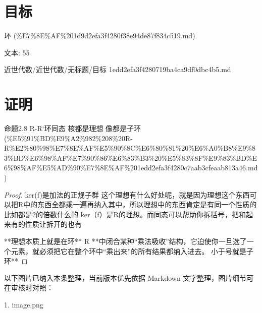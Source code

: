 \section*{目标}

\begin{note}[来源上级主题]

环 (\%E7\%8E\%AF\%201d9d2efa3f4280f38e94de87f834c519.md)

\end{note}

\begin{note}[目标]

文本: 55

\end{note}

\begin{note}[来源路径]

近世代数/近世代数/无标题/目标 1edd2efa3f4280719ba4ca9df0dbc4b5.md

\end{note}

\section*{证明}

\begin{note}[来源上级主题]

命题2.8 R-R‘环同态 核都是理想 像都是子环 (\%E5\%91\%BD\%E9\%A2\%982\%208\%20R-R\%E2\%80\%98\%E7\%8E\%AF\%E5\%90\%8C\%E6\%80\%81\%20\%E6\%A0\%B8\%E9\%83\%BD\%E6\%98\%AF\%E7\%90\%86\%E6\%83\%B3\%20\%E5\%83\%8F\%E9\%83\%BD\%E6\%98\%AF\%E5\%AD\%90\%E7\%8E\%AF\%201edd2efa3f4280c7aab3cfeaab813a46.md)

\end{note}

\begin{proof}

ker(f)是加法的正规子群 这个理想有什么好处呢，就是因为理想这个东西可以把R中的东西全都乘一遍再纳入其中，所以理想中的东西肯定是有同一个性质的比如都是2的倍数什么的 ker（f）是R的理想。而同态可以帮助你拆括号，把和起来有的性质让拆开的也有

**理想本质上就是在环** R **中闭合某种“乘法吸收”结构，它迫使你一旦选了一个元素，就必须把它在整个环中“乘出来”的所有结果都纳入进去。 小于号就是子环**

\end{proof}

\begin{note}[关联图片]
以下图片已纳入本条整理，当前版本优先依据 Markdown 文字整理，图片细节可在审核时对照：

1. image.png\\

\end{note}

